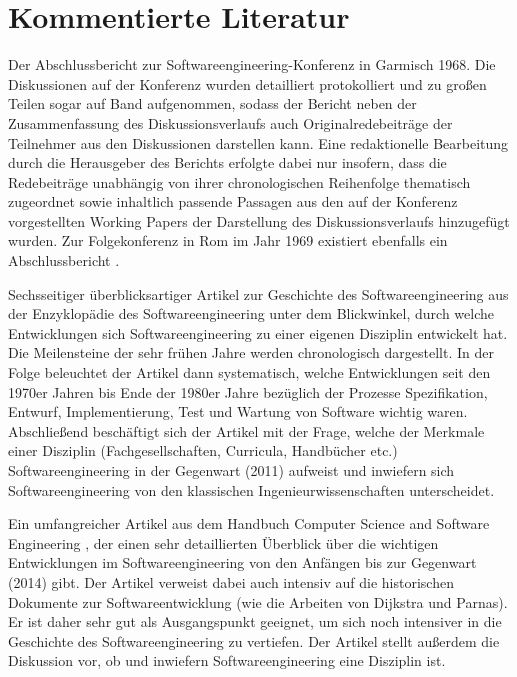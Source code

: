 \section{Kommentierte Literatur}
\label{sec:Kap-1.3}

{Der Abschlussbericht zur Softwareengineering-Konferenz in Garmisch 1968. Die Diskussionen auf der Konferenz wurden detailliert protokolliert und zu großen Teilen sogar auf Band aufgenommen, sodass der Bericht neben der Zusammenfassung des Dis\-kussions\-verlaufs auch Originalredebeiträge der Teilnehmer aus den Diskussionen darstellen kann. Eine redaktionelle Bearbeitung durch die Herausgeber des Berichts erfolgte dabei nur insofern, dass die Redebeiträge unabhängig von ihrer chronologischen Reihenfolge thematisch zugeordnet sowie inhaltlich passende Passagen aus den auf der Konferenz vorgestellten Working Papers der Darstellung des Dis\-kus\-sions\-verlaufs hinzugefügt wurden. Zur Folgekonferenz in Rom im Jahr 1969 existiert ebenfalls ein Abschlussbericht \cite{bux70}.}

{Sechsseitiger überblicksartiger Artikel zur Geschichte des Softwareengineering aus der Enzyklopädie des Softwareengineering \cite{lap11} unter dem Blickwinkel, durch welche Entwicklungen sich Softwareengineering zu einer eigenen Disziplin entwickelt hat. Die Meilensteine der sehr frühen Jahre werden chronologisch dargestellt. In der Folge beleuchtet der Artikel dann systematisch, welche Entwicklungen seit den 1970er Jahren bis Ende der 1980er Jahre bezüglich der Prozesse Spezifikation, Entwurf, Implementierung, Test und Wartung von Software wichtig waren. Abschließend beschäftigt sich der Artikel mit der Frage, welche der Merkmale einer Disziplin (Fachgesellschaften, Curricula, Handbücher etc.) Softwareengineering in der Gegenwart (2011) aufweist und inwiefern sich Softwareengineering von den klassischen Ingenieurwissenschaften unterscheidet.}

{Ein umfangreicher Artikel aus dem Handbuch Computer Science and Software \linebreak %
	Engineering \cite{gon14}, der einen sehr detaillierten Überblick über die wichtigen Entwicklungen im Softwareengineering von den Anfängen bis zur Gegenwart (2014) gibt. Der Artikel verweist dabei auch intensiv auf die historischen Dokumente zur Softwareentwicklung (wie \zb die Arbeiten von Dijkstra und Parnas). Er ist daher sehr gut als Ausgangspunkt geeignet, um sich noch intensiver in die Geschichte des Softwareengineering zu vertiefen. Der Artikel stellt außerdem die Diskussion vor, ob und inwiefern Softwareengineering eine Disziplin ist.}


